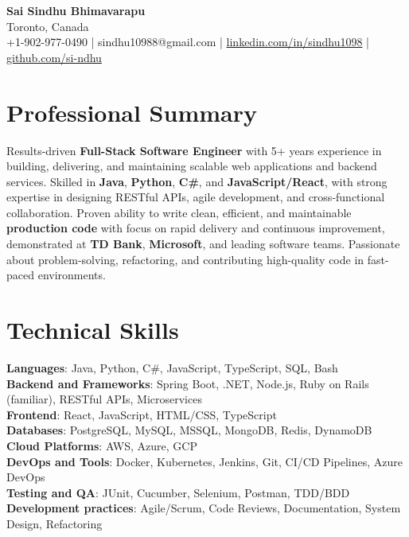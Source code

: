 \documentclass[letterpaper,11pt]{article}
\begin{document}
\begin{center}
  {\Large \textbf{Sai Sindhu Bhimavarapu}} \\
  Toronto, Canada \\
  +1-902-977-0490 \enspace | \enspace sindhu10988@gmail.com \enspace | \enspace \href{https://www.linkedin.com/in/sindhu1098/}{linkedin.com/in/sindhu1098} \enspace | \enspace \href{https://github.com/si-ndhu}{github.com/si-ndhu}
\end{center}

\section{Professional Summary}
  \begin{itemize}[leftmargin=0.15in, label={}]
    \small{\item{
     Results-driven \textbf{Full-Stack Software Engineer} with 5+ years experience in building, delivering, and maintaining scalable web applications and backend services. Skilled in \textbf{Java}, \textbf{Python}, \textbf{C\#}, and \textbf{JavaScript/React}, with strong expertise in designing RESTful APIs, agile development, and cross-functional collaboration. Proven ability to write clean, efficient, and maintainable \textbf{production code} with focus on rapid delivery and continuous improvement, demonstrated at \textbf{TD Bank}, \textbf{Microsoft}, and leading software teams. Passionate about problem-solving, refactoring, and contributing high-quality code in fast-paced environments.
    }}
  \end{itemize}
\vspace{-16pt}

\section{Technical Skills}
 \begin{itemize}[leftmargin=0.15in, label={}]
    \small{\item{
     \textbf{Languages}: Java, Python, C\#, JavaScript, TypeScript, SQL, Bash \\
     \textbf{Backend and Frameworks}: Spring Boot, .NET, Node.js, Ruby on Rails (familiar), RESTful APIs, Microservices \\
     \textbf{Frontend}: React, JavaScript, HTML/CSS, TypeScript \\
     \textbf{Databases}: PostgreSQL, MySQL, MSSQL, MongoDB, Redis, DynamoDB \\
     \textbf{Cloud Platforms}: AWS, Azure, GCP \\
     \textbf{DevOps and Tools}: Docker, Kubernetes, Jenkins, Git, CI/CD Pipelines, Azure DevOps \\
     \textbf{Testing and QA}: JUnit, Cucumber, Selenium, Postman, TDD/BDD \\
     \textbf{Development practices}: Agile/Scrum, Code Reviews, Documentation, System Design, Refactoring
    }}
 \end{itemize}
\vspace{-16pt}
\end{document}
